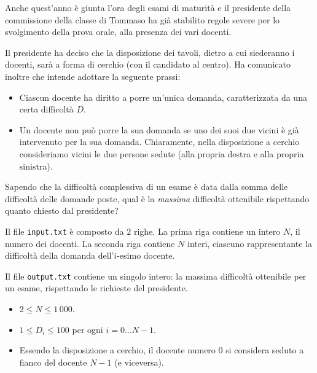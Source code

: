 \usepackage{xcolor}
\usepackage{afterpage}
\usepackage{pifont,mdframed}
\usepackage[bottom,symbol]{footmisc}

\makeatletter
\gdef\this@inputfilename{input.txt}
\gdef\this@outputfilename{output.txt}
\makeatother


\newcommand{\inputfile}{\texttt{input.txt}}
\newcommand{\outputfile}{\texttt{output.txt}}


Anche quest'anno è giunta l'ora degli esami di maturità e il presidente della commissione della classe di Tommaso ha già stabilito regole severe per lo svolgimento della prova orale, alla presenza dei vari docenti.

Il presidente ha deciso che la disposizione dei tavoli, dietro a cui siederanno i docenti, sarà a forma di cerchio (con il candidato al centro). Ha comunicato inoltre che intende adottare la seguente prassi:

\begin{itemize}
\item Ciascun docente ha diritto a porre un'unica domanda, caratterizzata da una certa difficoltà $D$.
\item Un docente non può porre la sua domanda se uno dei suoi due vicini è già intervenuto per la sua domanda. Chiaramente, nella disposizione a cerchio consideriamo vicini le due persone sedute (alla propria destra e alla propria sinistra).
\end{itemize}

Sapendo che la difficoltà complessiva di un esame è data dalla somma delle difficoltà delle domande poste, qual è la \emph{massima} difficoltà ottenibile rispettando quanto chiesto dal presidente?

\Input
Il file \inputfile{} è composto da $2$ righe. La prima riga contiene un intero $N$, il numero dei docenti. La seconda riga contiene $N$ interi, ciascuno rappresentante la difficoltà della domanda dell'$i$-esimo docente.

\Output
Il file \outputfile{} contiene un singolo intero: la massima difficoltà ottenibile per un esame, rispettando le richieste del presidente.

\Constraints
\begin{itemize}[nolistsep, itemsep=2mm]
\item $2 \le N \le 1\,000$.
\item $1 \le D_i \le 100$ per ogni $i=0 \ldots N-1$.
\item Essendo la disposizione a cerchio, il docente numero $0$ si considera seduto a fianco del docente $N-1$ (e viceversa).
\end{itemize}

